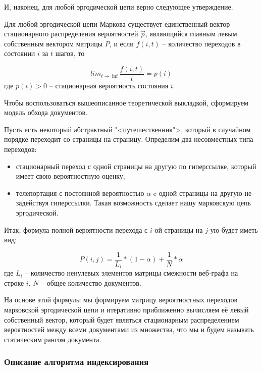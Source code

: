 И, наконец, для любой эргодической цепи верно следующее утверждение.

Для любой эргодической цепи Маркова существует единственный вектор стационарного распределения вероятностей $\vec{p}$, являющийся главным левым собственным вектором матрицы $P$, и если $f(i, t)$ -- количество переходов в состоянии $i$ за $t$ шагов, то 

\begin{equation}
lim_{t \to \inf}\frac{f(i, t)}{t}=p(i)
\end{equation} где $p(i) > 0$ -- стационарная вероятность состояния $i$.

Чтобы воспользоваться вышеописанное теоретической выкладкой, сформируем модель обхода документов.

Пусть есть некоторый абстрактный "<путешественник">, который в случайном порядке переходит со страницы на страницу.
Определим два несовместных типа переходов:
\begin{itemize}
\item стационарный переход с одной страницы на другую по гиперссылке, который имеет свою вероятностную оценку;
\item телепортация с постоянной вероятностью $\alpha$ c одной страницы на другую не задействуя гиперссылки. Такая возможность сделает нашу марковскую цепь эргодической.
\end{itemize}

Итак, формула полной вероятности перехода с $i$-ой страницы на $j$-ую будет иметь вид:

\begin{equation}
P(i, j) = \frac{1}{L_i} * (1 - \alpha) + \frac{1}{N} * \alpha
\end{equation} где $L_i$ -- количество ненулевых элементов матрицы смежности веб-графа на строке $i$, $N$ -- общее количество документов.

На основе этой формулы мы формируем матрицу вероятностных переходов марковской эргодической цепи и итеративно приближенно вычисляем её левый собственный вектор, который будет являться стационарным распределением вероятностей между всеми документами из множества, что мы и будем называть статическим рангом документа.

\subsubsection{Описание алгоритма индексирования}

